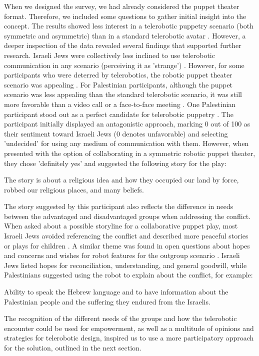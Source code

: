 \documentclass[dissertation,math,vertlayout,pdfa,colorlinks,nologo]{aaltoseries}
\begin{document}
When we designed the survey, we had already considered the puppet theater format. Therefore, we included some questions to gather initial insight into the concept. The results showed less interest in a telerobotic puppetry scenario (both symmetric and asymmetric) than in a standard telerobotic avatar \cite[p. 10]{peledTeleroboticIntergroupContact2024}. However, a deeper inspection of the data revealed several findings that supported further research. Israeli Jews were collectively less inclined to use telerobotic communication in any scenario (perceiving it as 'strange') \cite[p. 8]{peledTeleroboticIntergroupContact2024}. However, for some participants who were deterred by telerobotics, the robotic puppet theater scenario was appealing \cite[p. 13]{peledTeleroboticIntergroupContact2024}. For Palestinian participants, although the puppet scenario was less appealing than the standard telerobotic scenario, it was still more favorable than a video call or a face-to-face meeting \cite[p. 10]{peledTelerobotContactHypothesis2022}. One Palestinian participant stood out as a perfect candidate for telerobotic puppetry \cite[p. 14]{peledTeleroboticIntergroupContact2024}. The participant initially displayed an antagonistic approach, marking 0 out of 100 as their sentiment toward Israeli Jews (0 denotes unfavorable) and selecting 'undecided' for using any medium of communication with them. However, when presented with the option of collaborating in a symmetric robotic puppet theater, they chose 'definitely yes' and suggested the following story for the play:
\begin{displayquote}
The story is about a religious idea and how they occupied our land by force, robbed our
religious places, and many beliefs.
\end{displayquote}

The story suggested by this participant also reflects the difference in needs between the advantaged and disadvantaged groups when addressing the conflict. When asked about a possible storyline for a collaborative puppet play, most Israeli Jews avoided referencing the conflict and described more peaceful stories or plays for children \cite[p. 14]{peledTeleroboticIntergroupContact2024}. A similar theme was found in open questions about hopes and concerns and wishes for robot features for the outgroup scenario \cite[p. 13]{peledTeleroboticIntergroupContact2024}. Israeli Jews listed hopes for reconciliation, understanding, and general goodwill, while Palestinians suggested using the robot to explain about the conflict, for example:
\begin{displayquote}
Ability to speak the Hebrew language and to have information about the Palestinian
people and the suffering they endured from the Israelis.
\end{displayquote}
The recognition of the different needs of the groups and how the telerobotic encounter could be used for empowerment, as well as a multitude of opinions and strategies for telerobotic design, inspired us to use a more participatory approach for the solution, outlined in the next section.
\end{document}
